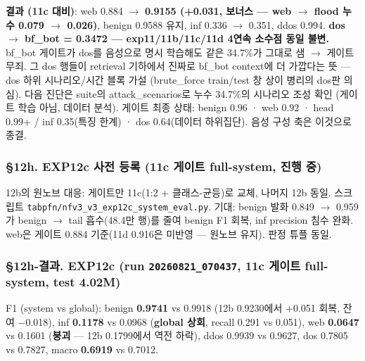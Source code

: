 \textbf{결과 (11c 대비)}: web 0.884 \ensuremath{\rightarrow} \textbf{0.9155 (+\allowbreak{}0.031, 보너스 — web \ensuremath{\rightarrow} flood 누수 0.079 \ensuremath{\rightarrow} 0.026)}, benign 0.9588 유지, inf 0.336 \ensuremath{\rightarrow} 0.351, ddos 0.994. \textbf{dos \ensuremath{\rightarrow} bf\_\allowbreak{}bot =\allowbreak{} 0.3472 — exp11/\allowbreak{}11b/\allowbreak{}11c/\allowbreak{}11d 4연속 소수점 동일 불변.} bf\_\allowbreak{}bot 게이트가 dos를 음성으로 명시 학습해도 같은 34.7\%가 그대로 샘  \ensuremath{\rightarrow}  게이트 무죄. 그 dos 행들이 retrieval 기하에서 진짜로 bf\_\allowbreak{}bot context에 더 가깝다는 뜻 — dos 하위 시나리오/\allowbreak{}시간 블록 가설 (brute\_\allowbreak{}force train/\allowbreak{}test 창 상이 병리의 dos판 의심). 다음 진단은 suite의 attack\_\allowbreak{}scenarios로 누수 34.7\%의 시나리오 조성 확인 (게이트 학습 아님, 데이터 분석). 게이트 최종 상태: benign 0.96 · web 0.92 · head 0.99+\allowbreak{} /\allowbreak{} inf 0.35(특징 한계) · dos 0.64(데이터 하위집단). 음성 구성 축은 이것으로 종결.

\subsubsection{§12h. EXP12c 사전 등록 (11c 게이트 full-system, 진행 중)}
12b의 원노브 대응: 게이트만 11c(1:2 +\allowbreak{} 클래스-균등)로 교체, 나머지 12b 동일. 스크립트 \texttt{tabpfn/\allowbreak{}\allowbreak{}n\allowbreak{}fv3\_\allowbreak{}\allowbreak{}v3\_\allowbreak{}\allowbreak{}e\allowbreak{}xp12c\_\allowbreak{}\allowbreak{}sy\allowbreak{}stem\_\allowbreak{}\allowbreak{}eva\allowbreak{}l.\allowbreak{}py}. 기대: benign 발화 0.849 \ensuremath{\rightarrow} 0.959가 benign \ensuremath{\rightarrow} tail 흡수(48.4만 행)를 줄여 benign F1 회복, inf precision 침수 완화. web은 게이트 0.884 기준(11d 0.916은 미반영 — 원노브 유지). 판정 튜플 동일.

\subsubsection{§12h-결과. EXP12c (run \texttt{20260821\allowbreak{}\_\allowbreak{}\allowbreak{}070437}, 11c 게이트 full-system, test 4.02M)}
F1 (system vs global): benign \textbf{0.9741} vs 0.9918 (12b 0.9230에서 +\allowbreak{}0.051 회복, 잔여 −0.018), inf \textbf{0.1178} vs 0.0968 (\textbf{global 상회}, recall 0.291 vs 0.051), web \textbf{0.0647} vs 0.1601 (\textbf{붕괴} — 12b 0.1799에서 역전 하락), ddos 0.9939 vs 0.9627, dos 0.7805 vs 0.7827, macro \textbf{0.6919} vs 0.7012.

